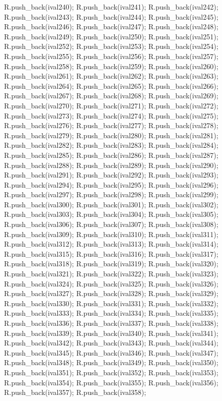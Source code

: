 \begin{DoxyCode}
{R.push_back(ival240);
R.push_back(ival241);
R.push_back(ival242);
R.push_back(ival243);
R.push_back(ival244);
R.push_back(ival245);
R.push_back(ival246);
R.push_back(ival247);
R.push_back(ival248);
R.push_back(ival249);
R.push_back(ival250);
R.push_back(ival251);
R.push_back(ival252);
R.push_back(ival253);
R.push_back(ival254);
R.push_back(ival255);
R.push_back(ival256);
R.push_back(ival257);
R.push_back(ival258);
R.push_back(ival259);
R.push_back(ival260);
R.push_back(ival261);
R.push_back(ival262);
R.push_back(ival263);
R.push_back(ival264);
R.push_back(ival265);
R.push_back(ival266);
R.push_back(ival267);
R.push_back(ival268);
R.push_back(ival269);
R.push_back(ival270);
R.push_back(ival271);
R.push_back(ival272);
R.push_back(ival273);
R.push_back(ival274);
R.push_back(ival275);
R.push_back(ival276);
R.push_back(ival277);
R.push_back(ival278);
R.push_back(ival279);
R.push_back(ival280);
R.push_back(ival281);
R.push_back(ival282);
R.push_back(ival283);
R.push_back(ival284);
R.push_back(ival285);
R.push_back(ival286);
R.push_back(ival287);
R.push_back(ival288);
R.push_back(ival289);
R.push_back(ival290);
R.push_back(ival291);
R.push_back(ival292);
R.push_back(ival293);
R.push_back(ival294);
R.push_back(ival295);
R.push_back(ival296);
R.push_back(ival297);
R.push_back(ival298);
R.push_back(ival299);
R.push_back(ival300);
R.push_back(ival301);
R.push_back(ival302);
R.push_back(ival303);
R.push_back(ival304);
R.push_back(ival305);
R.push_back(ival306);
R.push_back(ival307);
R.push_back(ival308);
R.push_back(ival309);
R.push_back(ival310);
R.push_back(ival311);
R.push_back(ival312);
R.push_back(ival313);
R.push_back(ival314);
R.push_back(ival315);
R.push_back(ival316);
R.push_back(ival317);
R.push_back(ival318);
R.push_back(ival319);
R.push_back(ival320);
R.push_back(ival321);
R.push_back(ival322);
R.push_back(ival323);
R.push_back(ival324);
R.push_back(ival325);
R.push_back(ival326);
R.push_back(ival327);
R.push_back(ival328);
R.push_back(ival329);
R.push_back(ival330);
R.push_back(ival331);
R.push_back(ival332);
R.push_back(ival333);
R.push_back(ival334);
R.push_back(ival335);
R.push_back(ival336);
R.push_back(ival337);
R.push_back(ival338);
R.push_back(ival339);
R.push_back(ival340);
R.push_back(ival341);
R.push_back(ival342);
R.push_back(ival343);
R.push_back(ival344);
R.push_back(ival345);
R.push_back(ival346);
R.push_back(ival347);
R.push_back(ival348);
R.push_back(ival349);
R.push_back(ival350);
R.push_back(ival351);
R.push_back(ival352);
R.push_back(ival353);
R.push_back(ival354);
R.push_back(ival355);
R.push_back(ival356);
R.push_back(ival357);
R.push_back(ival358);
}
\end{DoxyCode}
